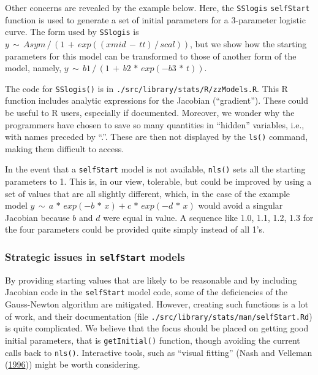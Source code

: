 \documentclass[
]{article}
\begin{document}
Other concerns are revealed by the example below. Here, the
\texttt{SSlogis} \texttt{selfStart} function is used to generate a set
of initial parameters for a 3-parameter logistic curve. The form used by
\texttt{SSlogis} is
\(y \,\sim\, Asym\,/\, (1 \,+\, exp((xmid\,-\,tt)\,/\,scal))\), but we
show how the starting parameters for this model can be transformed to
those of another form of the model, namely,
\(y \,\sim\, b1\,/\,(1 \,+\, b2\,*\,exp(-b3\,*\,t))\).

The code for \texttt{SSlogis()} is in
\texttt{./src/library/stats/R/zzModels.R}. This R function includes
analytic expressions for the Jacobian (``gradient''). These could be
useful to R users, especially if documented. Moreover, we wonder why the
programmers have chosen to save so many quantities in ``hidden''
variables, i.e., with names preceded by ``.''. These are then not
displayed by the \texttt{ls()} command, making them difficult to access.

In the event that a \texttt{selfStart} model is not available,
\texttt{nls()} sets all the starting parameters to 1. This is, in our
view, tolerable, but could be improved by using a set of values that are
all slightly different, which, in the case of the example model
\(y \,\sim\, a \,*\, exp(-b \,*\, x) + c\,*\,exp(-d \,*\, x)\) would
avoid a singular Jacobian because \(b\) and \(d\) were equal in value. A
sequence like 1.0, 1.1, 1.2, 1.3 for the four parameters could be
provided quite simply instead of all 1's.

\hypertarget{strategic-issues-in-selfstart-models}{%
\subsubsection{\texorpdfstring{Strategic issues in \texttt{selfStart}
models}{Strategic issues in selfStart models}}\label{strategic-issues-in-selfstart-models}}

By providing starting values that are likely to be reasonable and by
including Jacobian code in the \texttt{selfStart} model code, some of
the deficiencies of the Gauss-Newton algorithm are mitigated. However,
creating such functions is a lot of work, and their documentation (file
\texttt{./src/library/stats/man/selfStart.Rd}) is quite complicated. We
believe that the focus should be placed on getting good initial
parameters, that is \texttt{getInitial()} function, though avoiding the
current calls back to \texttt{nls()}. Interactive tools, such as
``visual fitting'' (Nash and Velleman
(\protect\hyperlink{ref-nash1996nonlinear}{1996})) might be worth
considering.
\end{document}
